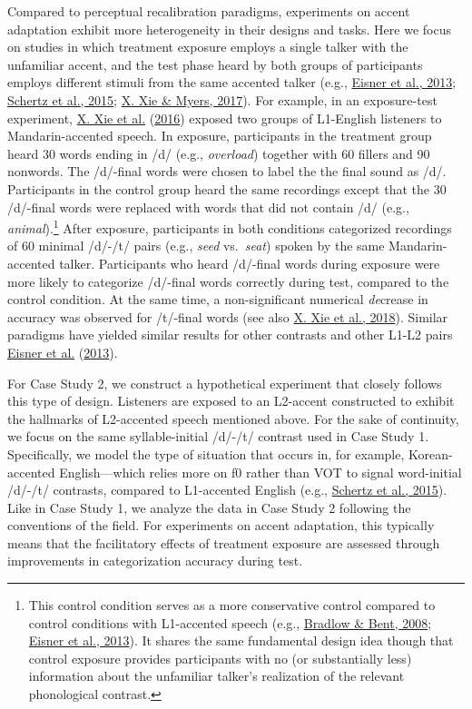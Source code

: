 \documentclass[
  11pt,
  english,
  man,floatsintext]{apa6}
\begin{document}
Compared to perceptual recalibration paradigms, experiments on accent adaptation exhibit more heterogeneity in their designs and tasks. Here we focus on studies in which treatment exposure employs a single talker with the unfamiliar accent, and the test phase heard by both groups of participants employs different stimuli from the same accented talker (e.g., \protect\hyperlink{ref-eisner2013}{Eisner et al., 2013}; \protect\hyperlink{ref-schertz2015}{Schertz et al., 2015}; \protect\hyperlink{ref-xie2017}{X. Xie \& Myers, 2017}). For example, in an exposure-test experiment, \protect\hyperlink{ref-xie2016jep}{X. Xie et al.} (\protect\hyperlink{ref-xie2016jep}{2016}) exposed two groups of L1-English listeners to Mandarin-accented speech. In exposure, participants in the treatment group heard 30 words ending in /d/ (e.g., \emph{overload}) together with 60 fillers and 90 nonwords. The /d/-final words were chosen to label the the final sound as /d/. Participants in the control group heard the same recordings except that the 30 /d/-final words were replaced with words that did not contain /d/ (e.g., \emph{animal}).\footnote{This control condition serves as a more conservative control compared to control conditions with L1-accented speech (e.g., \protect\hyperlink{ref-bradlow-bent2008}{Bradlow \& Bent, 2008}; \protect\hyperlink{ref-eisner2013}{Eisner et al., 2013}). It shares the same fundamental design idea though that control exposure provides participants with no (or substantially less) information about the unfamiliar talker's realization of the relevant phonological contrast.}
After exposure, participants in both conditions categorized recordings of 60 minimal /d/-/t/ pairs (e.g., \emph{seed} vs.~\emph{seat}) spoken by the same Mandarin-accented talker. Participants who heard /d/-final words during exposure were more likely to categorize /d/-final words correctly during test, compared to the control condition. At the same time, a non-significant numerical \emph{de}crease in accuracy was observed for /t/-final words (see also \protect\hyperlink{ref-xie2018lcn}{X. Xie et al., 2018}). Similar paradigms have yielded similar results for other contrasts and other L1-L2 pairs \protect\hyperlink{ref-eisner2013}{Eisner et al.} (\protect\hyperlink{ref-eisner2013}{2013}).

For Case Study 2, we construct a hypothetical experiment that closely follows this type of design. Listeners are exposed to an L2-accent constructed to exhibit the hallmarks of L2-accented speech mentioned above. For the sake of continuity, we focus on the same syllable-initial /d/-/t/ contrast used in Case Study 1. Specifically, we model the type of situation that occurs in, for example, Korean-accented English---which relies more on f0 rather than VOT to signal word-initial /d/-/t/ contrasts, compared to L1-accented English (e.g., \protect\hyperlink{ref-schertz2015}{Schertz et al., 2015}). Like in Case Study 1, we analyze the data in Case Study 2 following the conventions of the field. For experiments on accent adaptation, this typically means that the facilitatory effects of treatment exposure are assessed through improvements in categorization accuracy during test.
\end{document}
